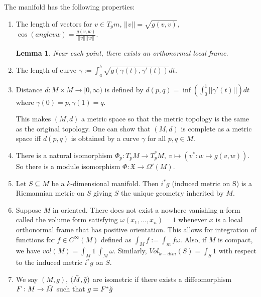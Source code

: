 \documentclass{article}
\newtheorem{lemma}[theorem]{Lemma}
\theoremstyle{definition}
\begin{document}
The manifold has the following properties: 
\begin{enumerate}
    \item The length of vectors for $v \in T_pm$, $||v|| = \sqrt{g(v,v)}$, $\cos (angle v w) = \frac{g(v,w)}{||v||||w||} $.
    
    \begin{lemma}
    Near each point, there exists an orthonormal local frame.
    \end{lemma}

    \item The length of curve $\gamma := \int_a^b \sqrt{g(\gamma(t),\gamma ' (t))} dt$.
    
    \item Distance $d: M \times M \rightarrow [0, \infty)$ is defined by $d(p,q) = \inf(\int_0^1 || \gamma '(t)|| )dt $ where $\gamma(0) = p, \gamma(1) = q$.

    This makes $(M,d)$ a metric space so that the metric topology is the same as the original topology. One can show that $(M,d)$ is complete as a metric space iff $d(p,q)$ is obtained by a curve $\gamma$ for all $p,q \in M$.
    
    \item There is a natural isomorphism $\Phi_p: T_pM \rightarrow T^*_pM, \ v \mapsto (v^* : w \mapsto g(v,w))$. So there is a module isomorphism $\Phi : \mathfrak X \rightarrow \Omega '(M)$.
    
    \item Let $S \subseteq M$ be a $k$-dimensional manifold. Then $i^*g$ (induced metric on S) is a Riemannian metric on $S$ giving $S$ the unique geometry inherited by $M$.
    
    \item Suppose $M$ in oriented. There does not exist a nowhere vanishing n-form called the volume form satisfying $\omega(x_1,\dots, x_n) = 1$ whenever $x$ is a local orthonormal frame that has positive orientation. This allows for integration of functions for $f \in C^\infty(M)$ defined as $\int_M f := \int_m f \omega $. Also, if $M$ is compact, we have $vol(M) = \int_M 1 \ \int_M  \omega $. Similarly, $Vol_{k-dim}(S) = \int_S 1$ with respect to the induced metric $i^* g$ on $S$.
    
    \item We say $(M, g)$, $(\Tilde{M}, \Tilde{g})$ are isometric if there exists a diffeomorphism $F: M \rightarrow \Tilde{M}$ such that $g = F^*\Tilde{g}$
\end{enumerate}
\end{document}
